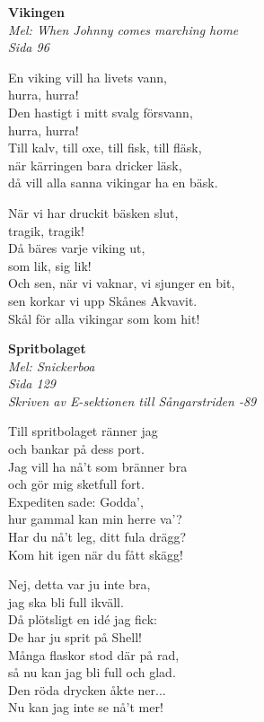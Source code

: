 \documentclass[10pt]{article}
\newenvironment{song}[2]{
	\textbf{#1}\\
	\emph{#2}\par
	\vspace{-1mm}
}{
	\vspace{2mm}
}
\begin{document}
\begin{multicols*}{2}
\vfill
\columnbreak

\begin{song}{Vikingen}{Mel: When Johnny comes marching home\\Sida 96}
	En viking vill ha livets vann,\\
	hurra, hurra!\\
	Den hastigt i mitt svalg försvann,\\
	hurra, hurra!\\
	Till kalv, till oxe, till fisk, till fläsk,\\
	när kärringen bara dricker läsk,\\
	då vill alla sanna vikingar ha en bäsk.

	När vi har druckit bäsken slut,\\
	tragik, tragik!\\
	Då bäres varje viking ut,\\
	som lik, sig lik!\\
	Och sen, när vi vaknar, vi sjunger en bit,\\
	sen korkar vi upp Skånes Akvavit.\\
	Skål för alla vikingar som kom hit!
\end{song}

\begin{song}{Spritbolaget}{Mel: Snickerboa\\Sida 129\\Skriven av E-sektionen till Sångarstriden -89}
	Till spritbolaget ränner jag\\
	och bankar på dess port.\\
	Jag vill ha nå't som bränner bra\\
	och gör mig sketfull fort.\\
	Expediten sade: Godda',\\
	hur gammal kan min herre va'?\\
	Har du nå't leg, ditt fula drägg?\\
	Kom hit igen när du fått skägg!

	Nej, detta var ju inte bra,\\
	jag ska bli full ikväll.\\
	Då plötsligt en idé jag fick:\\
	De har ju sprit på Shell!\\
	Många flaskor stod där på rad,\\
	så nu kan jag bli full och glad.\\
	Den röda drycken åkte ner...\\
	Nu kan jag inte se nå't mer!
\end{song}


\end{multicols*}
\end{document}

